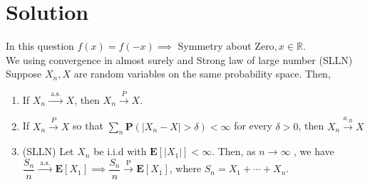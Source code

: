 \documentclass[journal,12pt,twocolumn]{IEEEtran}
\begin{document}
\section{Solution}
In this question $f(x)=f(-x)\implies$ Symmetry about Zero$,x\in\mathbb{R}.$\\
We using convergence in almost surely and Strong law of large number (SLLN)\\
Suppose $X_{n}, X$ are random variables on the same probability space. Then,\\
\begin{enumerate}
\item If $X_{n} \stackrel{\text { a.s. }}{\rightarrow} X$, then $X_{n} \stackrel{P}{\rightarrow} X$.
\item If $X_{n} \stackrel{P}{\rightarrow} X$ so that $\sum_{n} \mathbf{P}\left(\left|X_{n}-X\right|>\delta\right)<\infty$ for every $\delta>0$, then $X_{n} \stackrel{a_{\cdot B}}{\rightarrow} X$
\item (SLLN) Let $X_{n}$ be i.i.d with $\mathbf{E}\left[\left|X_{1}\right|\right]<\infty$. Then, as $n \rightarrow \infty$ , we have $\dfrac{S_{n}}{n} \stackrel{\text { a.s. }}{\rightarrow} \mathbf{E}\left[X_{1}\right]\implies \dfrac{S_{n}}{n} \stackrel{\text { P }}{\rightarrow} \mathbf{E}\left[X_{1}\right]  $, where $S_n = X_1 + \cdots + X_n.$
\end{enumerate}
\end{document}
